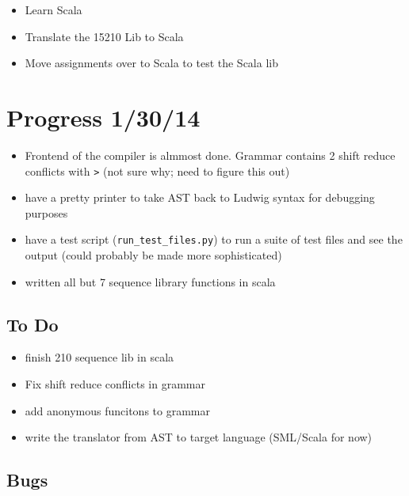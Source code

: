 \documentclass[11pt]{article}
\begin{document}
\begin{itemize}

\item Learn Scala

\item Translate the 15210 Lib to Scala

\item Move assignments over to Scala to test the Scala lib 

\end{itemize}

\section*{Progress 1/30/14}

\begin{itemize}
\item Frontend of the compiler is almmost done. Grammar contains 2 shift reduce conflicts with \verb">" (not sure why; need to figure this out)

\item have a pretty printer to take AST back to Ludwig syntax for debugging purposes

\item have a test script (\verb"run_test_files.py") to run a suite of test files and see the output (could probably be made more sophisticated)

\item written all but 7 sequence library functions in scala 
\end{itemize}

\subsection*{To Do}

\begin{itemize}
\item finish 210 sequence lib in scala

\item Fix shift reduce conflicts in grammar

\item add anonymous funcitons to grammar

\item write the translator from AST to target language (SML/Scala for now)
\end{itemize}

\subsection*{Bugs}
\end{document}
